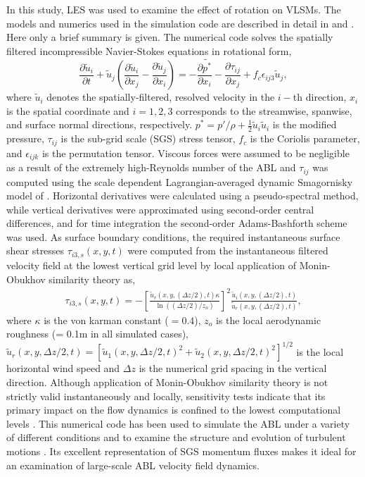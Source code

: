 \documentclass{svjour3}                     %
\begin{document}
In this study, LES was used to examine the effect of rotation on VLSMs. The models and numerics used in the simulation code are described in detail in \citet{stoll_wrr_2006} and \citet{stoll_blm_2008}.  Here only a brief summary is given.  The numerical code solves the spatially filtered incompressible Navier-Stokes equations in rotational form,
\begin{equation}
    \frac{\partial \tilde{u}_i}{\partial t}+ \tilde{u}_j\left(\frac{\partial \tilde{u}_i}{\partial x_{j}} -\frac{\partial \tilde{u}_j}{\partial x_{i}} \right)  = -\frac{\partial \tilde{p^*}}{\partial x_i}-\frac{\partial \tau_{ij}}{\partial x_j}+f_{c}\epsilon_{ij3}\tilde{u}_{j},  
\label{eqn:les_eqn}
\end{equation}
\noindent where $\tilde{u}_i$ denotes the spatially-filtered, resolved velocity in the $i-$th direction, $x_i$ is the spatial coordinate and $i=1, 2, 3$ corresponds to the streamwise, spanwise, and surface normal directions, respectively. $p^{*}=p'/\rho + \frac{1}{2}\tilde{u}_i\tilde{u}_i$ is the modified pressure, $\tau_{ij}$ is the sub-grid scale (SGS) stress tensor, $f_c$ is the Coriolis parameter, and $\epsilon_{ijk}$ is the permutation tensor. Viscous forces were assumed to be negligible as a result of the extremely high-Reynolds number of the ABL and $\tau_{ij}$ was computed using the scale dependent Lagrangian-averaged dynamic Smagornisky model of \citet{stoll_wrr_2006}. Horizontal derivatives were calculated using a pseudo-spectral method, while vertical derivatives were approximated using second-order central differences, and for time integration the second-order Adams-Bashforth scheme was used. As surface boundary conditions, the required instantaneous surface shear stresses $\tau_{i3,s}(x,y,t)$  were computed from the instantaneous filtered velocity field at the lowest vertical grid level by local application of Monin-Obukhov similarity theory \citep{stoll_blm_2006} as,
\begin{align}
\tau_{i3,s}(x,y,t) = -\left [ \frac{\tilde{u}_r(x,y,(\Delta z/2),t)\kappa}{\ln((\Delta z/2)/z_o)} \right ]^2\frac{\tilde{u}_i(x,y,(\Delta z/2),t)}{\tilde{u}_r(x,y,(\Delta z/2),t)}, 
\end{align}
\noindent where $\kappa$ is the von karman constant ($=0.4$), $z_o$ is the local aerodynamic roughness (= 0.1m in all simulated cases), $\tilde{u}_r(x,y,\Delta z/2,t)=[\tilde{u}_1(x,y,\Delta z/2,t)^{2}+\tilde{u}_2(x,y,\Delta z/2,t)^{2}]^{1/2}$ is the local horizontal wind speed and $\Delta z$ is the numerical grid spacing in the vertical direction. Although application of Monin-Obukhov similarity theory is not strictly valid instantaneously and locally, sensitivity tests indicate that its primary impact on the flow dynamics is confined to the lowest computational levels \citep{stoll_blm_2006}. This numerical code has been used to simulate the ABL under a variety of different conditions \citep[e.g.,][]{stoll_jas_2009,bailey_blm_2013,miller_blm_2013} and to examine the structure and evolution of turbulent motions \citep[e.g.,][]{bailey_ae_2014,bailey_jfm_2016}.  Its excellent representation of SGS momentum fluxes \citep{stoll_wrr_2006} makes it ideal for an examination of large-scale ABL velocity field dynamics.
\end{document}
